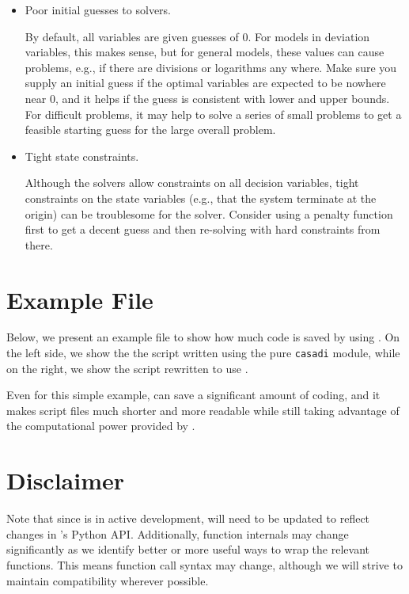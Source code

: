 \documentclass{article}
\begin{document}
\begin{itemize}
    \item Poor initial guesses to solvers.
    
    By default, all variables are given guesses of 0.
    For models in deviation variables, this makes sense, but for general models, these values can cause problems, e.g., if there are divisions or logarithms any where.
    Make sure you supply an initial guess if the optimal variables are expected to be nowhere near 0, and it helps if the guess is consistent with lower and upper bounds.
    For difficult problems, it may help to solve a series of small problems to get a feasible starting guess for the large overall problem.
    
    \item Tight state constraints.
    
    Although the solvers allow constraints on all decision variables, tight constraints on the state variables (e.g., that the system terminate at the origin) can be troublesome for the solver.
    Consider using a penalty function first to get a decent guess and then re-solving with hard constraints from there.
\end{itemize}

\section{Example File}

Below, we present an example file to show how much code is saved by using \mpctools{}.
On the left side, we show the the script written using the pure \texttt{casadi} module, while on the right, we show the script rewritten to use \mpctools{}.

\hspace{1em}

\begingroup
    \lstset{frame=none}
    
\endgroup

Even for this simple example, \mpctools{} can save a significant amount of coding, and it makes script files much shorter and more readable while still taking advantage of the computational power provided by \casadi{}.

\section{Disclaimer}

Note that since \casadi{} is in active development, \mpctools{} will need to be updated to reflect changes in \casadi{}'s Python API.
Additionally, function internals may change significantly as we identify better or more useful ways to wrap the relevant \casadi{} functions.
This means function call syntax may change, although we will strive to maintain compatibility wherever possible.
\end{document}
